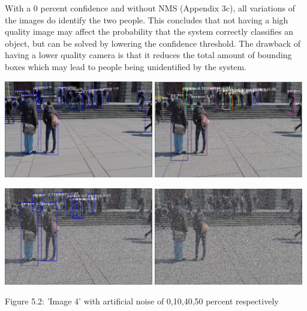 \documentclass[12pt]{report}
\begin{document}
\vspace{2mm}

With a 0 percent confidence and without NMS (Appendix 3c), all variations of the images do identify the two people. This concludes that not having a high quality image may affect the probability that the system correctly classifies an object, but can be solved by lowering the confidence threshold. The drawback of having a lower quality camera is that it reduces the total amount of bounding boxes which may lead to people being unidentified by the system.


\begin{center}
	\includegraphics[width=65mm]{./images/image45050.PNG}
	\includegraphics[width=65mm]{./images/appendix/imageAugment720pSandP.PNG}
	
	\vspace{2mm}
	\hspace{0.3mm}
	\includegraphics[width=65mm]{./images/appendix/imageAugment0.4SandP.PNG}
	\includegraphics[width=65mm]{./images/appendix/imageAugment0.5SandP.PNG}
	\vspace{3mm}
	
	{\footnotesize Figure 5.2: 'Image 4' with artificial noise of 0,10,40,50 percent respectively}
\end{center}
\end{document}
